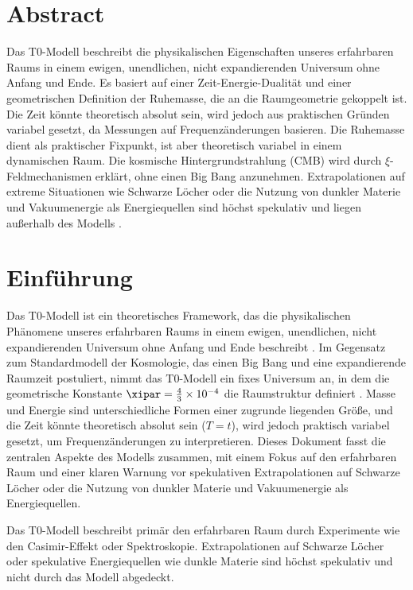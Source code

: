 
\section*{Abstract}
Das T0-Modell beschreibt die physikalischen Eigenschaften unseres erfahrbaren Raums in einem ewigen, unendlichen, nicht expandierenden Universum ohne Anfang und Ende. Es basiert auf einer Zeit-Energie-Dualität und einer geometrischen Definition der Ruhemasse, die an die Raumgeometrie gekoppelt ist. Die Zeit könnte theoretisch absolut sein, wird jedoch aus praktischen Gründen variabel gesetzt, da Messungen auf Frequenzänderungen basieren. Die Ruhemasse dient als praktischer Fixpunkt, ist aber theoretisch variabel in einem dynamischen Raum. Die kosmische Hintergrundstrahlung (CMB) wird durch \(\xi\)-Feldmechanismen erklärt, ohne einen Big Bang anzunehmen. Extrapolationen auf extreme Situationen wie Schwarze Löcher oder die Nutzung von dunkler Materie und Vakuumenergie als Energiequellen sind höchst spekulativ und liegen außerhalb des Modells \cite{pascher_t0_energie_2025}.

\section{Einführung}
\label{sec:einfuehrung}

Das T0-Modell ist ein theoretisches Framework, das die physikalischen Phänomene unseres erfahrbaren Raums in einem ewigen, unendlichen, nicht expandierenden Universum ohne Anfang und Ende beschreibt \cite{pascher_t0_energie_2025}. Im Gegensatz zum Standardmodell der Kosmologie, das einen Big Bang und eine expandierende Raumzeit postuliert, nimmt das T0-Modell ein fixes Universum an, in dem die geometrische Konstante \(\xipar = \frac{4}{3} \times 10^{-4}\) die Raumstruktur definiert \cite{Casimir1948}. Masse und Energie sind unterschiedliche Formen einer zugrunde liegenden Größe, und die Zeit könnte theoretisch absolut sein (\( T = t \)), wird jedoch praktisch variabel gesetzt, um Frequenzänderungen zu interpretieren. Dieses Dokument fasst die zentralen Aspekte des Modells zusammen, mit einem Fokus auf den erfahrbaren Raum und einer klaren Warnung vor spekulativen Extrapolationen auf Schwarze Löcher oder die Nutzung von dunkler Materie und Vakuumenergie als Energiequellen.

\begin{warning}[Hinweis]
	Das T0-Modell beschreibt primär den erfahrbaren Raum durch Experimente wie den Casimir-Effekt oder Spektroskopie. Extrapolationen auf Schwarze Löcher oder spekulative Energiequellen wie dunkle Materie sind höchst spekulativ und nicht durch das Modell abgedeckt.
\end{warning}

